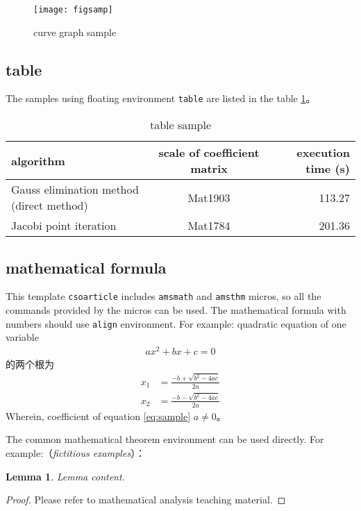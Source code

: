 ﻿\documentclass[UTF8]{csoarticle}
\newtheorem{lemma}{Lemma}
\begin{document}
\begin{figure}
\centering\texttt{[image: figsamp]}
\caption{curve graph sample}
\label{fig:sample}
\end{figure}

\subsection{table}

The samples using floating environment \verb|table| are listed in the table \ref{tab:sample}。
\begin{table}
  \caption{table sample}
  \label{tab:sample}
  \centering
  \begin{tabular}{lcr}%
    \hline
    algorithm                & scale of coefficient matrix    & execution time (s)  \\
    \hline
    Gauss elimination method (direct method)     & Mat1903           &  113.27       \\
     Jacobi point iteration            & Mat1784           &  201.36       \\
    \hline
  \end{tabular}
\end{table}

\subsection{mathematical formula}

This template \verb|csoarticle| includes \verb|amsmath| and \verb|amsthm| micros, so all the commands provided by the micros can be used. The mathematical formula with numbers should use \verb|align| environment. For example: quadratic equation of one variable
\begin{align}\label{eq:sample}
    a x^2 + b x + c = 0
\end{align}
的两个根为
\begin{align}\label{eq:root}
    x_1 &= \frac{-b + \sqrt{b^2 - 4ac}}{2a} \\
    x_2 &= \frac{-b - \sqrt{b^2 - 4ac}}{2a}
\end{align}
Wherein, coefficient of equation \eqref{eq:sample} $a \not= 0$。

The common mathematical theorem environment can be used directly. For example:（\emph{fictitious examples}）：
\begin{lemma}\label{lem:levy}
     Lemma content.
\end{lemma}
\begin{proof}
   Please refer to mathematical analysis teaching material.
\end{proof}
\end{document}
